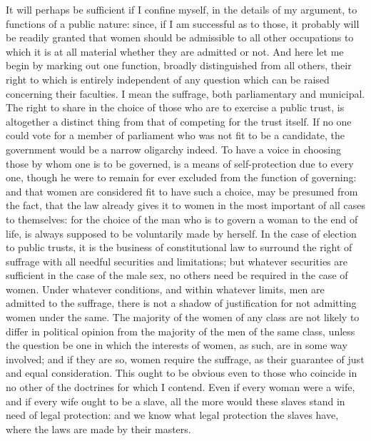 \documentclass[12pt]{report}
\begin{document}
It will perhaps be sufficient if I confine myself, in the details of my argument, to functions of a public nature: since, if I am successful as to those, it probably will be readily granted that women should be admissible to all other occupations to which it is at all material whether they are admitted or not. And here let me begin by marking out one function, broadly distinguished from all others, their right to which is entirely independent of any question which can be raised concerning their faculties. I mean the suffrage, both parliamentary and municipal. The right to share in the choice of those who are to exercise a public trust, is altogether a distinct thing from that of competing for the trust itself. If no one could vote for a member of parliament who was not fit to be a candidate, the government would be a narrow oligarchy indeed. To have a voice in choosing those by whom one is to be governed, is a means of self-protection due to every one, though he were to remain for ever excluded from the function of governing: and that women are considered fit to have such a choice, may be presumed from the fact, that the law already gives it to women in the most important of all cases to themselves: for the choice of the man who is to govern a woman to the end of life, is always supposed to be voluntarily made by herself. In the case of election to public trusts, it is the business of constitutional law to surround the right of suffrage with all needful securities and limitations; but whatever securities are sufficient in the case of the male sex, no others need be required in the case of women. Under whatever conditions, and within whatever limits, men are admitted to the suffrage, there is not a shadow of justification for not admitting women under the same. The majority of the women of any class are not likely to differ in political opinion from the majority of the men of the same class, unless the question be one in which the interests of women, as such, are in some way involved; and if they are so, women require the suffrage, as their guarantee of just and equal consideration. This ought to be obvious even to those who coincide in no other of the doctrines for which I contend. Even if every woman were a wife, and if every wife ought to be a slave, all the more would these slaves stand in need of legal protection: and we know what legal protection the slaves have, where the laws are made by their masters.
\end{document}
